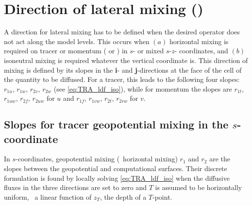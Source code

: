 \documentclass[../main/NEMO_manual]{subfiles}
\begin{document}
\section[Direction of lateral mixing (\textit{ldfslp.F90})]{Direction of lateral mixing (\protect{})}
\label{sec:LDF_slp}


A direction for lateral mixing has to be defined when the desired operator does not act along the model levels.
This occurs when $(a)$ horizontal mixing is required on tracer or momentum
( or ) in $s$- or mixed $s$-$z$- coordinates,
and $(b)$ isoneutral mixing is required whatever the vertical coordinate is.
This direction of mixing is defined by its slopes in the \textbf{i}- and \textbf{j}-directions at the face of
the cell of the quantity to be diffused.
For a tracer, this leads to the following four slopes:
$r_{1u}$, $r_{1w}$, $r_{2v}$, $r_{2w}$ (see \autoref{eq:TRA_ldf_iso}),
while for momentum the slopes are  $r_{1t}$, $r_{1uw}$, $r_{2f}$, $r_{2uw}$ for $u$ and
$r_{1f}$, $r_{1vw}$, $r_{2t}$, $r_{2vw}$ for $v$.


\subsection{Slopes for tracer geopotential mixing in the $s$-coordinate}

In $s$-coordinates, geopotential mixing (\ie\ horizontal mixing) $r_1$ and $r_2$ are the slopes between
the geopotential and computational surfaces.
Their discrete formulation is found by locally solving \autoref{eq:TRA_ldf_iso} when
the diffusive fluxes in the three directions are set to zero and $T$ is assumed to be horizontally uniform,
\ie\ a linear function of $z_T$, the depth of a $T$-point.
\end{document}
